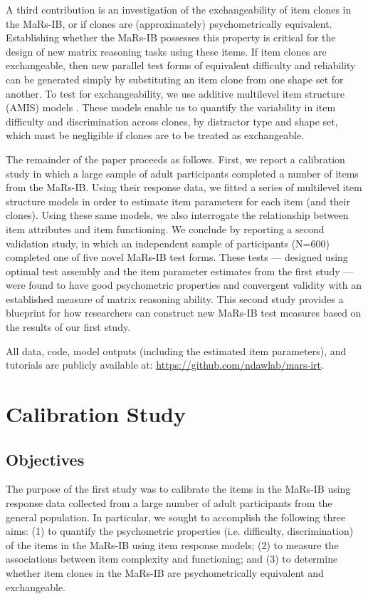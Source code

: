 \documentclass[a4paper,man,natbib]{apa6}
\begin{document}
A third contribution is an investigation of the exchangeability of item clones in the MaRs-IB, or if clones are (approximately) psychometrically equivalent. Establishing whether the MaRs-IB possesses this property is critical for the design of new matrix reasoning tasks using these items. If item clones are exchangeable, then new parallel test forms of equivalent difficulty and reliability can be generated simply by substituting an item clone from one shape set for another. To test for exchangeability, we use additive multilevel item structure (AMIS) models \citep{geerlings2011modeling, cho2014additive, lathrop2017item}. These models enable us to quantify the variability in item difficulty and discrimination across clones, by distractor type and shape set, which must be negligible if clones are to be treated as exchangeable. 

The remainder of the paper proceeds as follows. First, we report a calibration study in which a large sample of adult participants completed a number of items from the MaRs-IB. Using their response data, we fitted a series of multilevel item structure models in order to estimate item parameters for each item (and their clones). Using these same models, we also interrogate the relationship between item attributes and item functioning. We conclude by reporting a second validation study, in which an independent sample of participants (N=600) completed one of five novel MaRs-IB test forms. These tests --- designed using optimal test assembly and the item parameter estimates from the first study --- were found to have good psychometric properties and convergent validity with an established measure of matrix reasoning ability. This second study provides a blueprint for how researchers can construct new MaRs-IB test measures based on the results of our first study.

All data, code, model outputs (including the estimated item parameters), and tutorials are publicly available at: \url{https://github.com/ndawlab/mars-irt}.

\section{Calibration Study}

\subsection{Objectives}

The purpose of the first study was to calibrate the items in the MaRs-IB using response data collected from a large number of adult participants from the general population. In particular, we sought to accomplish the following three aims: (1) to quantify the psychometric properties (i.e. difficulty, discrimination) of the items in the MaRs-IB using item response models; (2) to measure the associations between item complexity and functioning; and (3) to determine whether item clones in the MaRs-IB are psychometrically equivalent and exchangeable.
\end{document}
